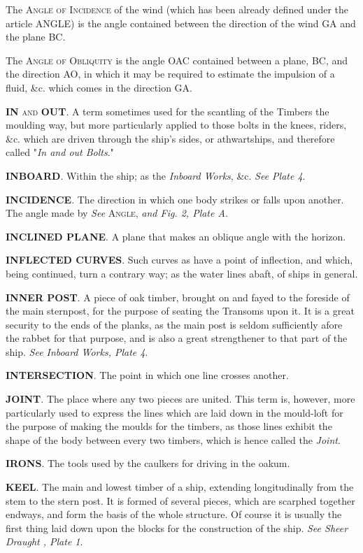 The \textsc{Angle of Incidence} of the wind (which has been already defined under the article ANGLE) is the angle contained between the direction of the wind GA and the plane BC. 

The \textsc{Angle of Obliquity} is the angle OAC contained between a plane, BC, and the direction AO, in which it may be required to estimate the impulsion of a fluid, \&c. which comes in the direction GA. 

\textbf{IN} \textsc{and} \textbf{OUT}. A term sometimes used for the scantling of the Timbers the moulding way, but more particularly applied to those bolts in the knees, riders, \&c. which are driven through the ship's sides, or athwartships, and therefore called "\textit{In and out Bolts}." 

\textbf{INBOARD}. Within the ship; as the \textit{Inboard Works}, \&c. \textit{See Plate 4}. 

\textbf{INCIDENCE}. The direction in which one body strikes or falls upon another. The angle made by \textit{See} \textsc{Angle}, \textit{and Fig. 2, Plate A}. 

\textbf{INCLINED PLANE}. A plane that makes an oblique angle with the horizon. 

\textbf{INFLECTED CURVES}. Such curves as have a point of inflection, and which, being continued, turn a contrary way; as the water lines abaft, of ships in general. 

\textbf{INNER POST}. A piece of oak timber, brought on and fayed to the foreside of the main sternpost, for the purpose of seating the Transoms upon it. It is a great security to the ends of the planks, as the main post is seldom sufficiently afore the rabbet for that purpose, and is also a great strengthener to that part of the ship. \textit{See Inboard Works, Plate 4}. 

\textbf{INTERSECTION}. The point in which one line crosses another. 

\textbf{JOINT}. The place where any two pieces are united. This term is, however, more particularly used to express the lines which are laid down in the mould-loft for the purpose of making the moulds for the timbers, as those lines exhibit the shape of the body between every two timbers, which is hence called the \textit{Joint}. 

\textbf{IRONS}. The tools used by the caulkers for driving in the oakum. 

\textbf{KEEL}. The main and lowest timber of a ship, extending longitudinally from the stem to the stern post. It is formed of several pieces, which are scarphed together endways, and form the basis of the whole structure. Of course it is usually the first thing laid down upon the blocks for the construction of the ship. \textit{See Sheer Draught , Plate 1}. 

